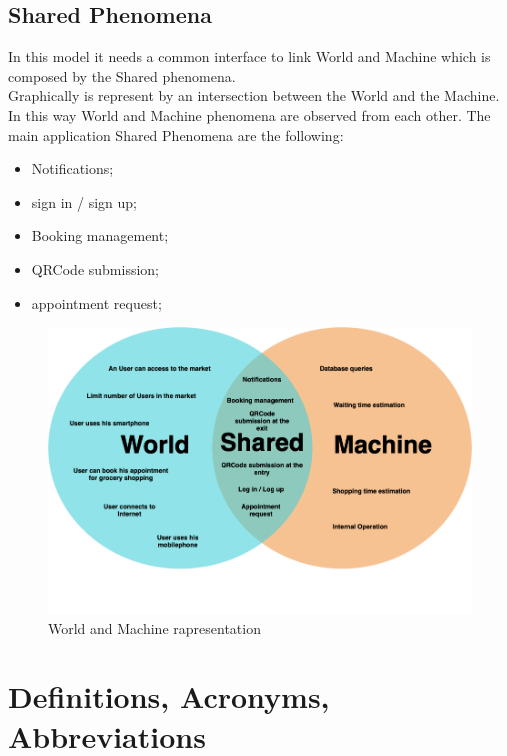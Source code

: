 \subsection{Shared Phenomena} 
In this model it needs a common interface to link World and Machine which is composed by the Shared phenomena. \\
Graphically is represent by an intersection between the World and the Machine. In this way World and Machine phenomena are observed from each other.  
The main application Shared Phenomena are the following:
\begin{itemize}
\item Notifications;
\item sign in / sign up;
\item Booking management;
\item QRCode submission;
\item appointment request;
\end{itemize}
\begin{figure}[H]
  \caption{World and Machine rapresentation}
  \label{fig:Reservation}
  \centering
  \includegraphics[scale = 0.38]{diagrams/VENN.png}
\end{figure}
\pagebreak
\section{Definitions, Acronyms, Abbreviations}
